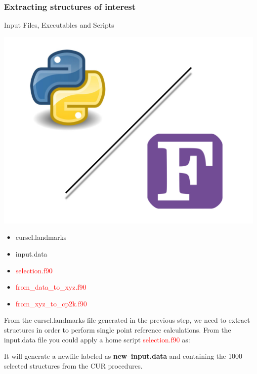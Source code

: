 \documentclass[12pt]{article}
\begin{document}
\subsubsection{Extracting structures of interest}
\begin{mybox2}{{Input Files, Executables and Scripts}}
\begin{minipage}[c]{0.5\linewidth}
\includegraphics[scale=0.1]{Python-fortran.jpeg}
\end{minipage}
\begin{minipage}[c]{0.5\linewidth}
\begin{itemize}
    \item cursel.landmarks
    \item input.data
    \item \textcolor{red}{selection.f90}
    \item \textcolor{red}{from\_data\_to\_xyz.f90}
    \item \textcolor{red}{from\_xyz\_to\_cp2k.f90}
\end{itemize}
\end{minipage}
\end{mybox2}
From the cursel.landmarks file generated in the previous step, we need to extract structures in order to perform single point reference calculations. From the input.data file you could apply a home script \textcolor{red}{selection.f90} as:
\begin{center}
\end{center}
It will generate a newfile labeled as \textbf{new--input.data} and containing the 1000 selected structures from the CUR procedures. 
\end{document}
